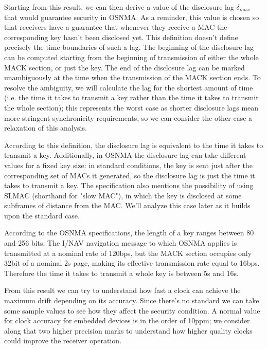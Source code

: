 Starting from this result, we can then derive a value of the disclosure lag
$\delta_{max}$ that would guarantee security in OSNMA. As a reminder, this value
is chosen so that receivers have a guarantee that whenever they receive a MAC
the corresponding key hasn't been disclosed yet. This definition doesn't define
precisely the time boundaries of such a lag. The beginning of the disclosure lag
can be computed starting from the beginning of transmission of either the whole
MACK section, or just the key. The end of the disclosure lag can be marked
unambiguously at the time when the transmission of the MACK section ends. To
resolve the ambiguity, we will calculate the lag for the shortest amount of time
(i.e. the time it takes to transmit a key rather than the time it takes to
transmit the whole section); this represents the worst case as shorter
disclosure lags mean more stringent synchronicity requirements, so we can
consider the other case a relaxation of this analysis.

According to this definition, the disclosure lag is equivalent to the time it
takes to transmit a key. Additionally, in OSNMA the disclosure lag can take
different values for a fixed key size: in standard conditions, the key is sent
just after the corresponding set of MACs it generated, so the disclosure lag is
just the time it takes to transmit a key. The specification also mentions the
possibility of using SLMAC (shorthand for "slow MAC"), in which the key is
disclosed at some subframes of distance from the MAC. We'll analyze this case
later as it builds upon the standard case.

\vspace{\baselineskip}

According to the OSNMA specifications, the length of a key ranges between 80 and
256 bits. The I/NAV navigation message to which OSNMA applies is
transmitted at a nominal rate of \num{120}\si{bps}, but the MACK section
occupies only \num{32}\si{bit} of a nominal \num{2}\si{s} page, making its effective
transmission rate equal to \num{16}\si{bps}. Therefore
the time it takes to transmit a whole key is between \num{5}\si{s} and
\num{16}\si{s}.

From this result we can try to understand how fast a clock can achieve the
maximum drift depending on its accuracy. Since there's no standard we can take
some sample values to see how they affect the security condition. A normal value
for clock accuracy for embedded devices is in the order of \num{10}\si{ppm}; we
consider along that two higher precision marks to understand how higher quality
clocks could improve the receiver operation.

